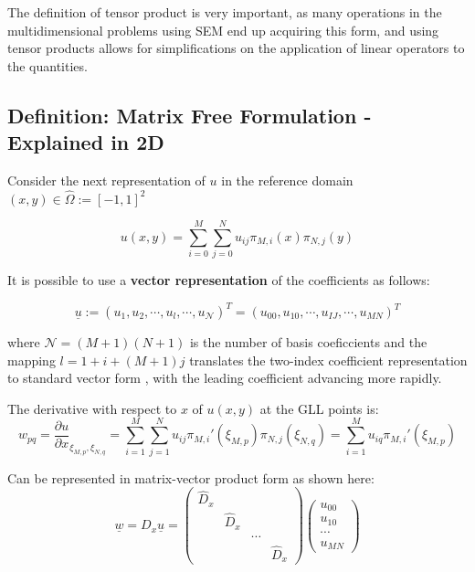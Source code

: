 \documentclass[
  a4paper,
  10pt]{article}
\begin{document}
The definition of tensor product is very important, as many operations
in the multidimensional problems using SEM end up acquiring this form,
and using tensor products allows for simplifications on the application
of linear operators to the quantities.

\hypertarget{definition-matrix-free-formulation---explained-in-2d}{%
\subsection{Definition: Matrix Free Formulation - Explained in
2D}\label{definition-matrix-free-formulation---explained-in-2d}}

Consider the next representation of \(u\) in the reference
domain\((x,y) \in \hat{\Omega}:=[-1,1]^{2}\)

\begin{equation}
    u(x,y)=\sum_{i=0}^{M}\sum_{j=0}^{N} u_{ij} \pi_{M,i}(x) \pi_{N,j}(y) 
\end{equation}

It is possible to use a \textbf{vector representation} of the
coefficients as follows:

\begin{equation}
    \underline{u} := (u_1,u_2,\cdots,u_l,\cdots,u_{\mathcal{N}})^{T}=(u_{00},u_{10},\cdots,u_{IJ},\cdots,u_{MN})^{T} 
\end{equation}

where \(\mathcal{N}=(M+1)(N+1)\) is the number of basis coeficcients and
the mapping \(l=1+i+(M+1)j\) translates the two-index coefficient
representation to standard vector form , with the leading coefficient
advancing more rapidly.

The derivative with respect to \(x\) of \(u(x,y)\) at the GLL points is:
\begin{equation}
    w_{pq}=\frac{\partial u}{\partial x}_{\xi_{M,p},\xi_{N,q}}=\sum_{i=1}^{M}\sum_{j=1}^{N} u_{ij} \pi_{M,i}'(\xi_{M,p}) \pi_{N,j}(\xi_{N,q})= \sum_{i=1}^{M} u_{iq} \pi_{M,i}'(\xi_{M,p})
\end{equation}

Can be represented in matrix-vector product form as shown here:
\begin{equation}
    \underline{w}=D_x\underline{u}=
    \begin{pmatrix}
    \hat{D}_x &           &        & \\
              & \hat{D}_x &        & \\
              &           & \cdots & \\
              &           &        & \hat{D}_x
    \end{pmatrix} 
    \begin{pmatrix}
    u_{00} \\
    u_{10} \\
    \cdots \\
    u_{MN}
    \end{pmatrix}
\end{equation}
\end{document}
